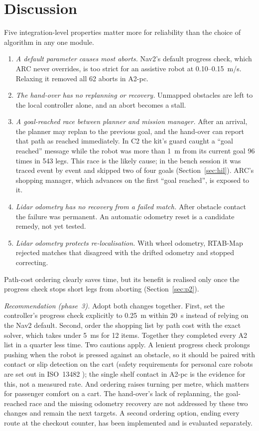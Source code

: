 \documentclass[conference]{IEEEtran}
\begin{document}
\section{Discussion}
\label{sec:disc}
Five integration-level properties matter more for reliability than the choice of algorithm in any one module.
\begin{enumerate}
\item \textit{A default parameter causes most aborts.} Nav2's default progress check, which ARC never overrides, is too strict for an assistive robot at 0.10--0.15~m/s. Relaxing it removed all 62 aborts in A2-pc.
\item \textit{The hand-over has no replanning or recovery.} Unmapped obstacles are left to the local controller alone, and an abort becomes a stall.
\item \textit{A goal-reached race between planner and mission manager.} After an arrival, the planner may replan to the previous goal, and the hand-over can report that path as reached immediately. In C2 the kit's guard caught a ``goal reached'' message while the robot was more than 1~m from its current goal 96 times in 543 legs. This race is the likely cause; in the bench session it was traced event by event and skipped two of four goals (Section~\ref{sec:hil}). ARC's shopping manager, which advances on the first ``goal reached'', is exposed to it.
\item \textit{Lidar odometry has no recovery from a failed match.} After obstacle contact the failure was permanent. An automatic odometry reset is a candidate remedy, not yet tested.
\item \textit{Lidar odometry protects re-localisation.} With wheel odometry, RTAB-Map rejected matches that disagreed with the drifted odometry and stopped correcting.
\end{enumerate}
Path-cost ordering clearly saves time, but its benefit is realised only once the progress check stops short legs from aborting (Section~\ref{sec:p2}).

\textit{Recommendation (phase~3).} Adopt both changes together. First, set the controller's progress check explicitly to 0.25~m within 20~s instead of relying on the Nav2 default. Second, order the shopping list by path cost with the exact solver, which takes under 5~ms for 12 items. Together they completed every A2 list in a quarter less time. Two cautions apply. A lenient progress check prolongs pushing when the robot is pressed against an obstacle, so it should be paired with contact or slip detection on the cart (safety requirements for personal care robots are set out in ISO~13482 \cite{iso13482}); the single shelf contact in A2-pc is the evidence for this, not a measured rate. And ordering raises turning per metre, which matters for passenger comfort on a cart. The hand-over's lack of replanning, the goal-reached race and the missing odometry recovery are not addressed by these two changes and remain the next targets. A second ordering option, ending every route at the checkout counter, has been implemented and is evaluated separately.
\end{document}
